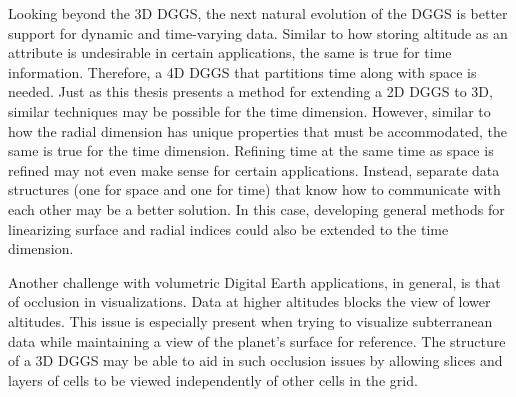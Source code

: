 Looking beyond the 3D DGGS, the next natural evolution of the DGGS is better support for dynamic and time-varying data.
Similar to how storing altitude as an attribute is undesirable in certain applications, the same is true for time information.
Therefore, a 4D DGGS that partitions time along with space is needed.
Just as this thesis presents a method for extending a 2D DGGS to 3D, similar techniques may be possible for the time dimension.
However, similar to how the radial dimension has unique properties that must be accommodated, the same is true for the time dimension.
Refining time at the same time as space is refined may not even make sense for certain applications.
Instead, separate data structures (one for space and one for time) that know how to communicate with each other may be a better solution.
In this case, developing general methods for linearizing surface and radial indices could also be extended to the time dimension.


Another challenge with volumetric Digital Earth applications, in general, is that of occlusion in visualizations.
Data at higher altitudes blocks the view of lower altitudes.
This issue is especially present when trying to visualize subterranean data while maintaining a view of the planet's surface for reference.
The structure of a 3D DGGS may be able to aid in such occlusion issues by allowing slices and layers of cells to be viewed independently of other cells in the grid.
